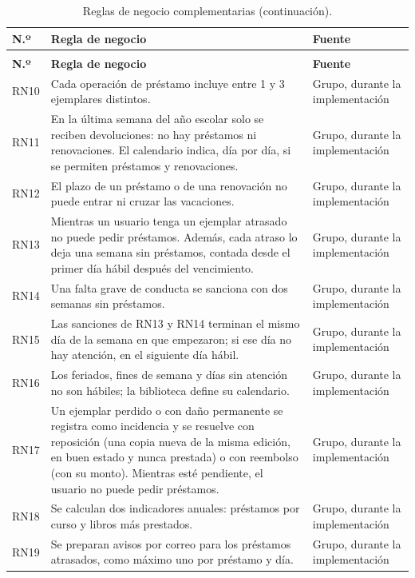 \documentclass[11pt,a4paper]{article}
\begin{document}
\begin{longtable}{@{}l p{} p{}@{}}
\caption{Reglas de negocio complementarias.}\\
\toprule
\textbf{N.º} & \textbf{Regla de negocio} & \textbf{Fuente}\\
\midrule
\endfirsthead
\caption[]{Reglas de negocio complementarias (continuación).}\\
\toprule
\textbf{N.º} & \textbf{Regla de negocio} & \textbf{Fuente}\\
\midrule
\endhead
RN10 & Cada operación de préstamo incluye entre 1 y 3 ejemplares distintos. & Grupo, durante la implementación\\
RN11 & En la última semana del año escolar solo se reciben devoluciones: no hay préstamos ni renovaciones. El calendario indica, día por día, si se permiten préstamos y renovaciones. & Grupo, durante la implementación\\
RN12 & El plazo de un préstamo o de una renovación no puede entrar ni cruzar las vacaciones. & Grupo, durante la implementación\\
RN13 & Mientras un usuario tenga un ejemplar atrasado no puede pedir préstamos. Además, cada atraso lo deja una semana sin préstamos, contada desde el primer día hábil después del vencimiento. & Grupo, durante la implementación\\
RN14 & Una falta grave de conducta se sanciona con dos semanas sin préstamos. & Grupo, durante la implementación\\
RN15 & Las sanciones de RN13 y RN14 terminan el mismo día de la semana en que empezaron; si ese día no hay atención, en el siguiente día hábil. & Grupo, durante la implementación\\
RN16 & Los feriados, fines de semana y días sin atención no son hábiles; la biblioteca define su calendario. & Grupo, durante la implementación\\
RN17 & Un ejemplar perdido o con daño permanente se registra como incidencia y se resuelve con reposición (una copia nueva de la misma edición, en buen estado y nunca prestada) o con reembolso (con su monto). Mientras esté pendiente, el usuario no puede pedir préstamos. & Grupo, durante la implementación\\
RN18 & Se calculan dos indicadores anuales: préstamos por curso y libros más prestados. & Grupo, durante la implementación\\
RN19 & Se preparan avisos por correo para los préstamos atrasados, como máximo uno por préstamo y día. & Grupo, durante la implementación\\
\bottomrule
\end{longtable}
\end{document}
